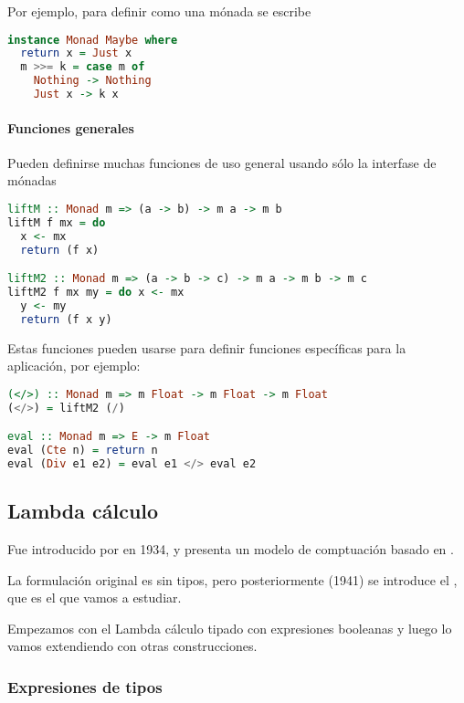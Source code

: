 Por ejemplo, para definir  como una mónada se escribe

\begin{lstlisting}[language=Haskell]
instance Monad Maybe where
  return x = Just x
  m >>= k = case m of
    Nothing -> Nothing
    Just x -> k x
\end{lstlisting}

\paragraph{Funciones generales}

Pueden definirse muchas funciones de uso general usando sólo la interfase de mónadas
\begin{lstlisting}[language=Haskell]
liftM :: Monad m => (a -> b) -> m a -> m b
liftM f mx = do
  x <- mx
  return (f x)

liftM2 :: Monad m => (a -> b -> c) -> m a -> m b -> m c
liftM2 f mx my = do x <- mx
  y <- my
  return (f x y)
\end{lstlisting}

Estas funciones pueden usarse para definir funciones específicas para la aplicación, por ejemplo:

\begin{lstlisting}[language=Haskell]
(</>) :: Monad m => m Float -> m Float -> m Float
(</>) = liftM2 (/)

eval :: Monad m => E -> m Float
eval (Cte n) = return n
eval (Div e1 e2) = eval e1 </> eval e2
\end{lstlisting}

\subsection{Lambda cálculo}

Fue introducido por  en 1934, y presenta un modelo de comptuación basado en .

La formulación original es sin tipos, pero posteriormente (1941) se introduce el , que es el que vamos a estudiar.

Empezamos con el Lambda cálculo tipado con expresiones booleanas y luego lo vamos extendiendo con otras construcciones.

\subsubsection{Expresiones de tipos}

